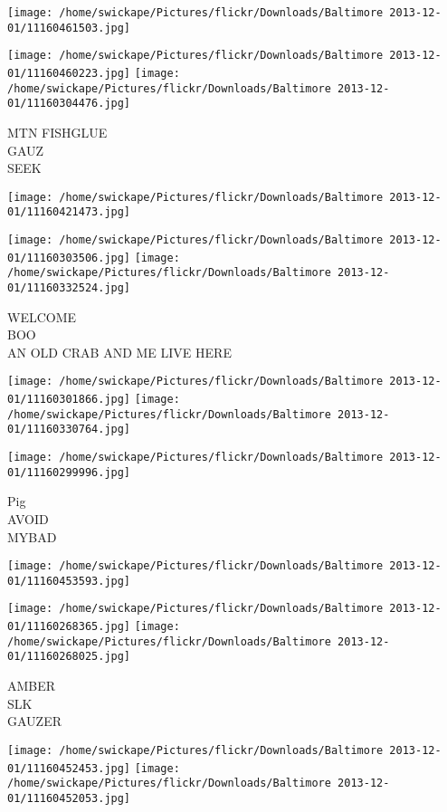 \documentclass[10pt,letterpaper]{article}
\begin{document}
\texttt{[image: /home/swickape/Pictures/flickr/Downloads/Baltimore 2013-12-01/11160461503.jpg]}

\vspace{0.25in}
\texttt{[image: /home/swickape/Pictures/flickr/Downloads/Baltimore 2013-12-01/11160460223.jpg]}
\texttt{[image: /home/swickape/Pictures/flickr/Downloads/Baltimore 2013-12-01/11160304476.jpg]}

MTN FISHGLUE\\
GAUZ\\
SEEK
\pagebreak

\texttt{[image: /home/swickape/Pictures/flickr/Downloads/Baltimore 2013-12-01/11160421473.jpg]}

\vspace{0.25in}
\texttt{[image: /home/swickape/Pictures/flickr/Downloads/Baltimore 2013-12-01/11160303506.jpg]}
\texttt{[image: /home/swickape/Pictures/flickr/Downloads/Baltimore 2013-12-01/11160332524.jpg]}

WELCOME\\
BOO\\
AN OLD CRAB AND ME LIVE HERE
\pagebreak

\texttt{[image: /home/swickape/Pictures/flickr/Downloads/Baltimore 2013-12-01/11160301866.jpg]}
\texttt{[image: /home/swickape/Pictures/flickr/Downloads/Baltimore 2013-12-01/11160330764.jpg]}

\texttt{[image: /home/swickape/Pictures/flickr/Downloads/Baltimore 2013-12-01/11160299996.jpg]}

Pig\\
AVOID\\
MYBAD
\pagebreak

\texttt{[image: /home/swickape/Pictures/flickr/Downloads/Baltimore 2013-12-01/11160453593.jpg]}

\vspace{0.25in}
\texttt{[image: /home/swickape/Pictures/flickr/Downloads/Baltimore 2013-12-01/11160268365.jpg]}
\texttt{[image: /home/swickape/Pictures/flickr/Downloads/Baltimore 2013-12-01/11160268025.jpg]}

AMBER\\
SLK\\
GAUZER
\pagebreak

\texttt{[image: /home/swickape/Pictures/flickr/Downloads/Baltimore 2013-12-01/11160452453.jpg]}
\texttt{[image: /home/swickape/Pictures/flickr/Downloads/Baltimore 2013-12-01/11160452053.jpg]}
\end{document}
